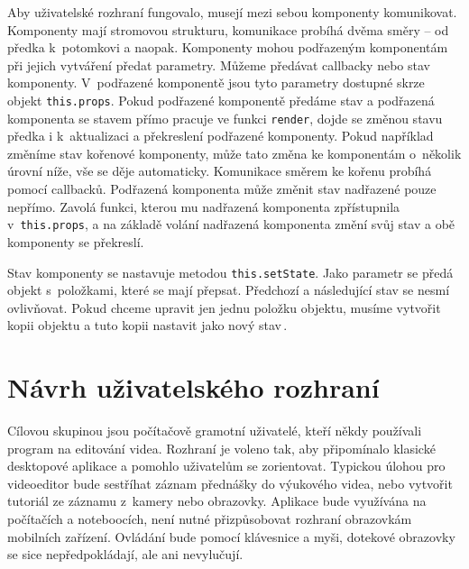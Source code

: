 Aby uživatelské rozhraní fungovalo, musejí mezi sebou komponenty komunikovat. Komponenty mají stromovou strukturu, komunikace probíhá dvěma směry -- od předka k~potomkovi a naopak. Komponenty mohou podřazeným komponentám při jejich vytváření předat parametry. Můžeme předávat callbacky nebo stav komponenty. V~podřazené komponentě jsou tyto parametry dostupné skrze objekt \texttt{this.props}. Pokud podřazené komponentě předáme stav a podřazená komponenta se stavem přímo pracuje ve funkci \texttt{render}, dojde se změnou stavu předka i k~aktualizaci a překreslení podřazené komponenty. Pokud například změníme stav kořenové komponenty, může tato změna  ke komponentám o~několik úrovní níže, vše se děje automaticky. Komunikace směrem ke kořenu probíhá pomocí callbacků. Podřazená komponenta může změnit stav nadřazené pouze nepřímo. Zavolá funkci, kterou mu nadřazená komponenta zpřístupnila v~\texttt{this.props}, a na základě volání nadřazená komponenta změní svůj stav a obě komponenty se překreslí.

Stav komponenty se nastavuje metodou \texttt{this.setState}. Jako parametr se předá objekt s~položkami, které se mají přepsat. Předchozí a následující stav se nesmí ovlivňovat. Pokud chceme upravit jen jednu položku objektu, musíme vytvořit kopii objektu a tuto kopii nastavit jako nový stav\,\cite{react}.

\section{Návrh uživatelského rozhraní}
Cílovou skupinou jsou počítačově gramotní uživatelé, kteří někdy používali program na editování videa. Rozhraní je voleno tak, aby připomínalo klasické desktopové aplikace a pomohlo uživatelům se zorientovat. Typickou úlohou pro videoeditor bude sestříhat záznam přednášky do výukového videa, nebo vytvořit tutoriál ze záznamu z~kamery nebo obrazovky. Aplikace bude využívána na počítačích a noteboocích, není nutné přizpůsobovat rozhraní obrazovkám mobilních zařízení. Ovládání bude pomocí klávesnice a myši, dotekové obrazovky se sice nepředpokládají, ale ani nevylučují.

